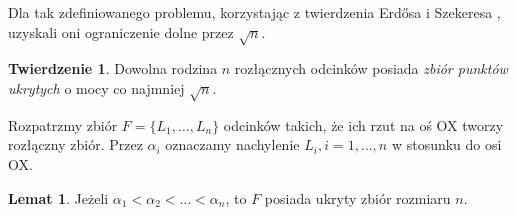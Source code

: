 \documentclass[brudnopis]{xmgr}
\theoremstyle{definition}
\newtheorem{Twierdzenie}{Twierdzenie}
\newtheorem{Lemat}{Lemat}
\begin{document}
Dla tak zdefiniowanego problemu, korzystając z twierdzenia Erd{\H o}sa i Szekeresa \cite{erdosszekeres}, uzyskali oni ograniczenie dolne przez $\sqrt{n}$.

\begin{Twierdzenie}\label{moc zbioru ukrytego tw} \cite{illumination}
  Dowolna rodzina $n$ rozłącznych odcinków posiada \emph{zbiór punktów ukrytych} o mocy co najmniej $\sqrt{n}$.
\end{Twierdzenie}

Rozpatrzmy zbiór $F = \{L_1,\ldots,L_n\}$ odcinków takich, że ich rzut na oś OX tworzy rozłączny zbiór. Przez $\alpha_i$ oznaczamy nachylenie $L_i, i = 1,\ldots,n$ w stosunku do osi OX.
\begin{Lemat}\label{zbior ukryty} \cite{illumination}
  Jeżeli $\alpha_1 < \alpha_2 < \ldots < \alpha_n$, to $F$ posiada ukryty zbiór rozmiaru $n$.
\end{Lemat}
\end{document}
